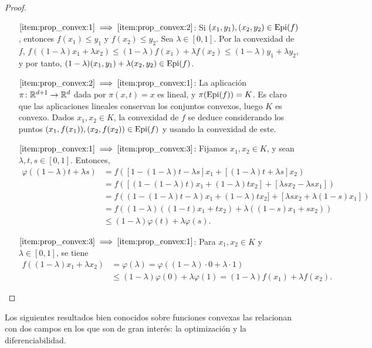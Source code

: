 \documentclass{book}
\begin{document}
\begin{proof}~
	\begin{enumerate}[align=left]
		\item[$\ref{item:prop_convex:1} \implies \ref{item:prop_convex:2}$:] Si $(x_1,y_1), (x_2,y_2) \in \operatorname{Epi}(f)$, entonces $f(x_1) \le y_1$ y $f(x_2) \le y_2$. Sea $\lambda \in [0,1]$. Por la convexidad de $f$, $f((1-\lambda)x_1 + \lambda x_2) \le (1-\lambda)f(x_1) + \lambda f(x_2) \le (1-\lambda)y_1 + \lambda y_2$, y por tanto, $(1-\lambda)(x_1,y_1) + \lambda(x_2,y_2) \in \operatorname{Epi}(f)$.
		\item[$\ref{item:prop_convex:2} \implies \ref{item:prop_convex:1}$:] La aplicación $\pi \colon \mathbb{R}^{d+1} \to \mathbb{R}^d$ dada por $\pi(x,t) = x$ es lineal, y $\pi(\operatorname{Epi}(f)) = K$. Es claro que las aplicaciones lineales conservan los conjuntos convexos, luego $K$ es convexo. Dados $x_1,x_2 \in K$, la convexidad de $f$ se deduce considerando los puntos $(x_1,f(x_1)),(x_2,f(x_2)) \in \operatorname{Epi}(f)$ y usando la convexidad de este.
		\item[$\ref{item:prop_convex:1} \implies \ref{item:prop_convex:3}$:] Fijamos $x_1,x_2 \in K$, y sean $\lambda,t,s\in [0,1]$. Entonces,
		\begin{align*}
			\varphi((1-\lambda)t + \lambda s) &= f([1-(1-\lambda)t - \lambda s]x_1 + [(1-\lambda)t + \lambda s]x_2 ) \\
										   &= f([(1-(1-\lambda)t) x_1 + (1-\lambda)tx_2] + [\lambda s x_2 - \lambda s x_1] ) \\
										   &= f((1-(1-\lambda)t - \lambda) x_1 + (1-\lambda)tx_2] + [\lambda s x_2 +\lambda(1- s) x_1]) \\
										   &= f((1-\lambda)((1-t)x_1 + tx_2) + \lambda((1-s)x_1 + sx_2)) \\
										   &\le (1-\lambda)\varphi(t) + \lambda\varphi(s).
		\end{align*}
		\item[$\ref{item:prop_convex:3} \implies \ref{item:prop_convex:1}$:] Para $x_1,x_2 \in K$ y $\lambda \in [0,1]$, se tiene
		\begin{align*}
			f((1-\lambda)x_1 + \lambda x_2) &= \varphi(\lambda) = \varphi((1-\lambda) \cdot 0 + \lambda \cdot 1) \\
											&\le (1-\lambda) \varphi(0) + \lambda\varphi(1) = (1-\lambda)f(x_1) + \lambda f(x_2). 
		\end{align*}
	\end{enumerate}
\end{proof}

Los siguientes resultados bien conocidos sobre funciones convexas las relacionan con dos campos en los que son de gran interés: la optimización y la diferenciabilidad.
\end{document}
